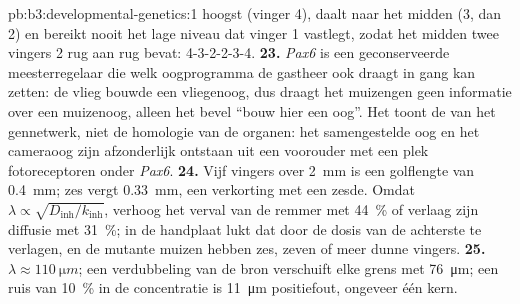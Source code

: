 \begin{solution}{pb:b3:developmental-genetics:1}
hoogst (vinger 4), daalt naar het midden (3, dan 2) en bereikt nooit
het lage niveau dat vinger 1 vastlegt, zodat het midden twee vingers 2
rug aan rug bevat: 4-3-2-2-3-4.
\textbf{23.} \emph{Pax6} is een geconserveerde meesterregelaar die
welk oogprogramma de gastheer ook draagt in gang kan zetten: de vlieg
bouwde een vliegenoog, dus draagt het muizengen geen informatie over
een muizenoog, alleen het bevel ``bouw hier een oog''. Het toont de
 van het gennetwerk, niet de homologie van de organen:
het samengestelde oog en het cameraoog zijn afzonderlijk ontstaan uit
een voorouder met een plek fotoreceptoren onder \emph{Pax6}.
\textbf{24.} Vijf vingers over \qty{2}{mm} is een golflengte van
\qty{0.4}{mm}; zes vergt \qty{0.33}{mm}, een verkorting met een zesde.
Omdat $\lambda \propto \sqrt{D_{\text{inh}}/k_{\text{inh}}}$, verhoog
het verval van de remmer met \qty{44}{\%} of verlaag zijn diffusie met
\qty{31}{\%}; in de handplaat lukt dat door de dosis van de achterste
 te verlagen, en de mutante muizen hebben zes, zeven of meer
dunne vingers.
\textbf{25.} $\lambda \approx \qty{110}{\micro m}$; een verdubbeling
van de bron verschuift elke grens met \qty{76}{\micro m}; een ruis van
\qty{10}{\%} in de concentratie is \qty{11}{\micro m} positiefout,
ongeveer één kern.
\end{solution}
